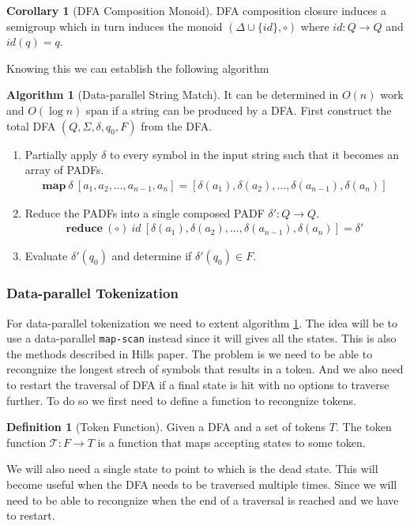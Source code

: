 \documentclass[a4paper,12pt]{article}
\theoremstyle{definition}
\newtheorem{definition}{Definition}[section]
\newtheorem{corollary}{Corollary}[section]
\newtheorem{algorithm}{Algorithm}[section]
\begin{document}
\begin{corollary}[DFA Composition Monoid]
  DFA composition closure induces a semigroup which in turn induces the monoid $(\Delta \cup \{id\}, \circ)$ where $id: Q \to Q$ and $id(q) = q$.
\end{corollary}
\noindent Knowing this we can establish the following algorithm
\begin{algorithm}[Data-parallel String Match]\label{algo:lex}
  It can be determined in $O(n)$ work and $O(\log n)$ span if a string can be produced by a DFA. First construct the total DFA $(Q, \Sigma, \delta, q_0, F)$ from the DFA.
  \begin{enumerate}
    \item Partially apply $\delta$ to every symbol in the input string such that it becomes an array of PADFs.
    \begin{align*}
      \mathbf{map}\: \delta \: [a_1, a_2, \dots, a_{n - 1}, a_n] = [\delta(a_1), \delta(a_2), \dots, \delta(a_{n - 1}), \delta(a_n)]
    \end{align*}
    \item Reduce the PADFs into a single composed PADF $\delta': Q \to Q$. \begin{align*}
      \mathbf{reduce} \: (\circ) \: id \: [\delta(a_1), \delta(a_2), \dots, \delta(a_{n - 1}), \delta(a_n)] = \delta'
    \end{align*}
    \item Evaluate $\delta'(q_0)$ and determine if $\delta'(q_0) \in F$.
  \end{enumerate}
\end{algorithm}

\subsubsection{Data-parallel Tokenization}
For data-parallel tokenization we need to extent algorithm \ref{algo:lex}. The idea will be to use a data-parallel \texttt{map-scan} instead since it will gives all the states. This is also the methods described in Hills \cite{HILL1992699} paper. The problem is we need to be able to recongnize the longest strech of symbols that results in a token. And we also need to restart the traversal of DFA if a final state is hit with no options to traverse further. To do so we first need to define a function to recongnize tokens.

\begin{definition}[Token Function]
  Given a DFA and a set of tokens $T$. The token function $\mathcal{T}: F \to T$ is a function that maps accepting states to some token.
\end{definition}
\noindent We will also need a single state to point to which is the dead state. This will become useful when the DFA needs to be traversed multiple times. Since we will need to be able to recongnize when the end of a traversal is reached and we have to restart.
\end{document}

